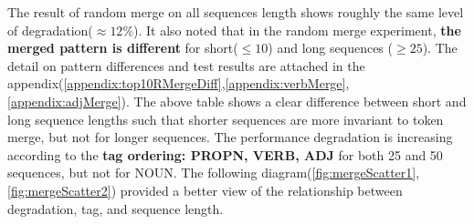 \documentclass[12pt]{article}
\begin{document}
The result of random merge on all sequences length shows roughly the same level of degradation($\approx12\%$). It also noted that in the random merge experiment, \textbf{the merged pattern is different} for short($\leq10$) and long sequences ($\geq25$). The detail on pattern differences and test results are attached in the appendix(\ref{appendix:top10RMergeDiff},\ref{appendix:verbMerge},\ref{appendix:adjMerge}). The above table shows a clear difference between short and long sequence lengths such that shorter sequences are more invariant to token merge, but not for longer sequences. The performance degradation is increasing according to the \textbf{tag ordering: PROPN, VERB, ADJ} for both 25 and 50 sequences, but not for NOUN. The following diagram(\ref{fig:mergeScatter1},\ref{fig:mergeScatter2}) provided a better view of the relationship between degradation, tag, and sequence length.
\end{document}
